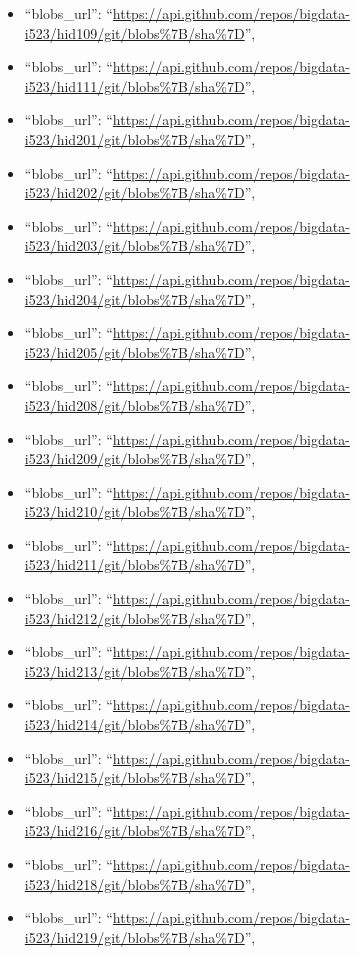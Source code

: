 \begin{itemize}
\item
  ``blobs\_url'':
  ``\url{https://api.github.com/repos/bigdata-i523/hid109/git/blobs\%7B/sha\%7D}'',
\item
  ``blobs\_url'':
  ``\url{https://api.github.com/repos/bigdata-i523/hid111/git/blobs\%7B/sha\%7D}'',
\item
  ``blobs\_url'':
  ``\url{https://api.github.com/repos/bigdata-i523/hid201/git/blobs\%7B/sha\%7D}'',
\item
  ``blobs\_url'':
  ``\url{https://api.github.com/repos/bigdata-i523/hid202/git/blobs\%7B/sha\%7D}'',
\item
  ``blobs\_url'':
  ``\url{https://api.github.com/repos/bigdata-i523/hid203/git/blobs\%7B/sha\%7D}'',
\item
  ``blobs\_url'':
  ``\url{https://api.github.com/repos/bigdata-i523/hid204/git/blobs\%7B/sha\%7D}'',
\item
  ``blobs\_url'':
  ``\url{https://api.github.com/repos/bigdata-i523/hid205/git/blobs\%7B/sha\%7D}'',
\item
  ``blobs\_url'':
  ``\url{https://api.github.com/repos/bigdata-i523/hid208/git/blobs\%7B/sha\%7D}'',
\item
  ``blobs\_url'':
  ``\url{https://api.github.com/repos/bigdata-i523/hid209/git/blobs\%7B/sha\%7D}'',
\item
  ``blobs\_url'':
  ``\url{https://api.github.com/repos/bigdata-i523/hid210/git/blobs\%7B/sha\%7D}'',
\item
  ``blobs\_url'':
  ``\url{https://api.github.com/repos/bigdata-i523/hid211/git/blobs\%7B/sha\%7D}'',
\item
  ``blobs\_url'':
  ``\url{https://api.github.com/repos/bigdata-i523/hid212/git/blobs\%7B/sha\%7D}'',
\item
  ``blobs\_url'':
  ``\url{https://api.github.com/repos/bigdata-i523/hid213/git/blobs\%7B/sha\%7D}'',
\item
  ``blobs\_url'':
  ``\url{https://api.github.com/repos/bigdata-i523/hid214/git/blobs\%7B/sha\%7D}'',
\item
  ``blobs\_url'':
  ``\url{https://api.github.com/repos/bigdata-i523/hid215/git/blobs\%7B/sha\%7D}'',
\item
  ``blobs\_url'':
  ``\url{https://api.github.com/repos/bigdata-i523/hid216/git/blobs\%7B/sha\%7D}'',
\item
  ``blobs\_url'':
  ``\url{https://api.github.com/repos/bigdata-i523/hid218/git/blobs\%7B/sha\%7D}'',
\item
  ``blobs\_url'':
  ``\url{https://api.github.com/repos/bigdata-i523/hid219/git/blobs\%7B/sha\%7D}'',

\end{itemize}
